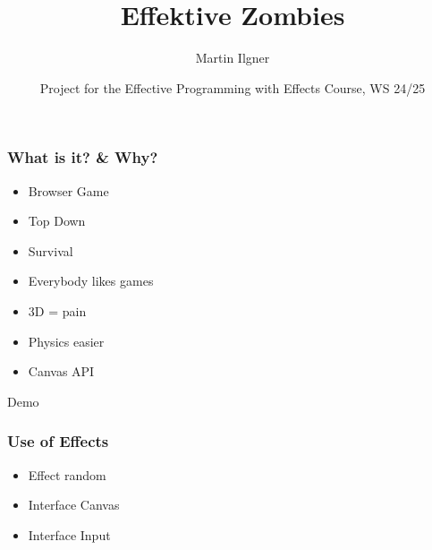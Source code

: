 \documentclass{beamer}
\title{Effektive Zombies}
\author{Martin Ilgner}
\institute{University of Tübingen}
\date{Project for the Effective Programming with Effects Course, WS 24/25}
\begin{document}
	
	\frame{\titlepage}
	
	\begin{frame}
		\frametitle{What is it? \& Why?}
		\begin{Large}
		\begin{itemize}
			\setlength{\itemsep}{.5em}
			\item Browser Game
			\item Top Down 
			\item Survival
			\item<2-> Everybody likes games
			\item<3-> 3D = pain
			\item<3-> Physics easier
			\item<4-> Canvas API
		\end{itemize}
		\end{Large}
	\end{frame}
	
	\begin{frame}[plain, c]
		\begin{center}
			\Huge Demo
		\end{center}
	\end{frame}
	
	\begin{frame}
		\frametitle{Use of Effects}
		\begin{Large}
		\begin{itemize}
			\setlength{\itemsep}{1em}
			\item Effect random
			\item Interface Canvas
			\item Interface Input
		\end{itemize}
		\end{Large}
	\end{frame}
	
	
	
\end{document}
